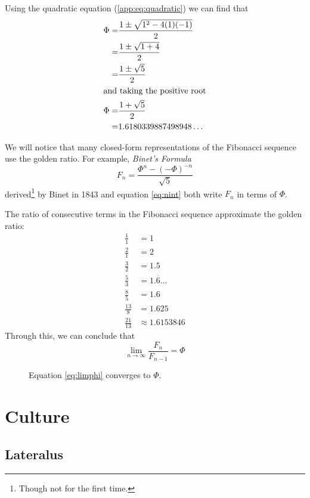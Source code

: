 Using the quadratic equation
(\ref{app:eq:quadratic})
we can find that
\begin{align*}
  \Phi =& \frac{1 \pm \sqrt{1^2-4(1)(-1)}}{2} \\
  =& \frac{1 \pm \sqrt{1+4}}{2} \\
  =& \frac{1 \pm \sqrt{5}}{2} \\
  \intertext{and taking the positive root}
  \Phi =& \frac{1 + \sqrt{5}}{2} \\
  =& 1.6180339887498948\dots
\end{align*}
\cite{mwgolden}

We will notice that many closed-form representations of the Fibonacci sequence use the golden ratio.
For example, \emph{Binet's Formula}
\begin{equation}
  F_n=\frac{\Phi^n-(-\Phi)^{-n}}{\sqrt{5}}
  \label{eq:binet}
\end{equation}
derived\footnote{Though not for the first time.} by Binet in 1843 and equation \ref{eq:nint} both write \(F_n\) in terms of \( \Phi \).\cite{mwbinet}

The ratio of consecutive terms in the Fibonacci sequence approximate the golden ratio:
\begin{align*}
  \frac{1}{1} &= 1 \\
  \frac{2}{1} &= 2 \\
  \frac{3}{2} &= 1.5 \\
  \frac{5}{3} &= 1.\overline{6}\dots \\
  \frac{8}{5} &= 1.6 \\
  \frac{13}{8} &= 1.625 \\
  \frac{21}{13} &\approx 1.6153846
\end{align*}
Through this, we can conclude that
\begin{equation}
  \lim_{n\to \infty} \frac{F_n}{F_{n-1}}=\Phi
  \label{eq:limphi}
\end{equation}
\cite{mwfib}

\begin{figure}[h]
  \begin{center}
    
  \end{center}
  \caption{Equation \ref{eq:limphi} converges to \( \Phi \).}
\end{figure}


\section{Culture}

\subsection{Lateralus}

